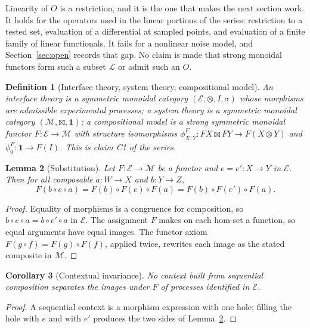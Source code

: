 \documentclass[11pt]{article}
\newtheorem{definition}{Definition}[section]
\newtheorem{lemma}[definition]{Lemma}
\newtheorem{corollary}[definition]{Corollary}
\theoremstyle{definition}
\begin{document}
Linearity of $O$ is a restriction, and it is the one that makes the next section
work. It holds for the operators used in the linear portions of the series: restriction to a tested
set, evaluation of a differential at sampled points, and evaluation of a finite
family of linear functionals. It fails for a nonlinear noise model, and
Section~\ref{sec:open} records that gap. No claim is made that strong monoidal
functors form such a subset $\mathcal L$ or admit such an $O$.

\begin{definition}[Interface theory, system theory, compositional model]
\label{def:model}
An \emph{interface theory} is a symmetric monoidal category
$(\mathcal E,\otimes,I,\sigma)$ whose morphisms are admissible experimental
processes; a \emph{system theory} is a symmetric monoidal category
$(\mathcal M,\boxtimes,\mathbf 1)$; a \emph{compositional model} is a strong
symmetric monoidal functor $F:\mathcal E\to\mathcal M$ with structure
isomorphisms $\phi^F_{X,Y}:FX\boxtimes FY\to F(X\otimes Y)$ and
$\phi_0^F:\mathbf 1\to F(I)$. This is claim C1 of the series.
\end{definition}

\begin{lemma}[Substitution]
\label{lem:subst}
Let $F:\mathcal E\to\mathcal M$ be a functor and $e=e':X\to Y$ in $\mathcal E$.
Then for all composable $a:W\to X$ and $b:Y\to Z$,
\[
F(b\circ e\circ a)=F(b)\circ F(e)\circ F(a)=F(b)\circ F(e')\circ F(a).
\]
\end{lemma}
\begin{proof}
Equality of morphisms is a congruence for composition, so
$b\circ e\circ a=b\circ e'\circ a$ in $\mathcal E$. The assignment $F$ makes on
each hom-set a function, so equal arguments have equal images. The functor axiom
$F(g\circ f)=F(g)\circ F(f)$, applied twice, rewrites each image as the stated
composite in $\mathcal M$.
\end{proof}

\begin{corollary}[Contextual invariance]
\label{cor:context}
No context built from sequential composition separates the images under $F$ of
processes identified in $\mathcal E$.
\end{corollary}
\begin{proof}
A sequential context is a morphism expression with one hole; filling the hole
with $e$ and with $e'$ produces the two sides of Lemma~\ref{lem:subst}.
\end{proof}
\end{document}
